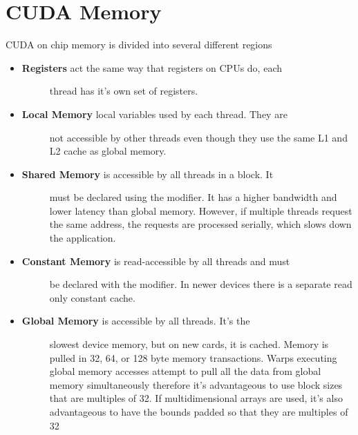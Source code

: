 \documentclass[letterpaper,10pt,openany,oneside]{sphinxmanual}
\begin{document}
\section{CUDA Memory}
\label{0-Architecture/Architecture:cuda-memory}
CUDA on chip memory is divided into several different regions
\begin{itemize}
\item {} \begin{description}
\item[{\textbf{Registers} act the same way that registers on CPUs do, each}] \leavevmode
thread has it's own set of registers.

\end{description}

\item {} \begin{description}
\item[{\textbf{Local Memory} local variables used by each thread. They are}] \leavevmode
not accessible by other threads even though they use the same
L1 and L2 cache as global memory.

\end{description}

\item {} \begin{description}
\item[{\textbf{Shared Memory} is accessible by all threads in a block. It}] \leavevmode
must be declared using the  modifier. It has a
higher bandwidth and lower latency than global memory. However, if
multiple threads request the same address, the requests are
processed serially, which slows down the application.

\end{description}

\item {} \begin{description}
\item[{\textbf{Constant Memory} is read-accessible by all threads and must}] \leavevmode
be declared with the  modifier. In newer devices
there is a separate read only constant cache.

\end{description}

\item {} \begin{description}
\item[{\textbf{Global Memory} is accessible by all threads. It's the}] \leavevmode
slowest device memory, but on new cards, it is cached. Memory
is pulled in 32, 64, or 128 byte memory transactions. Warps
executing global memory accesses attempt to pull all the data
from global memory simultaneously therefore it's advantageous
to use block sizes that are multiples of 32. If
multidimensional arrays are used, it's also advantageous to
have the bounds padded so that they are multiples of 32


\end{description}
\end{itemize}
\end{document}
